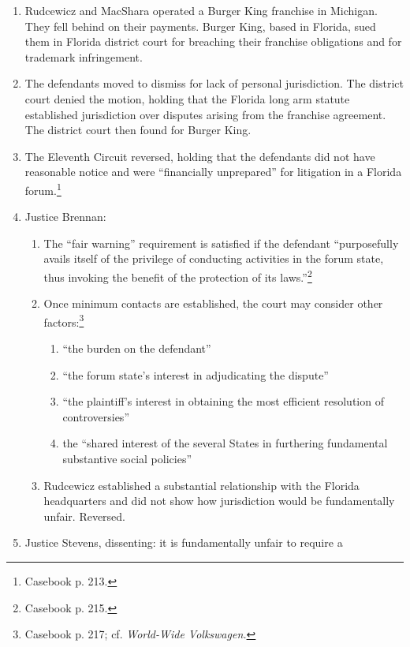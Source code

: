 \begin{enumerate}
    \item Rudcewicz and MacShara operated a Burger King franchise in Michigan. 
    They fell behind on their payments. Burger King, based in Florida, 
    sued them in Florida district court for breaching their franchise 
    obligations and for trademark infringement.
    \item The defendants moved to dismiss for lack of personal jurisdiction. 
    The district court denied the motion, holding that the Florida long arm statute 
    established jurisdiction over disputes arising from the franchise 
    agreement. The district court then found for Burger King.
    \item The Eleventh Circuit reversed, holding that the defendants did not 
    have reasonable notice and were ``financially unprepared'' for litigation 
    in a Florida forum.\footnote{Casebook p. 213.}
    \item Justice Brennan:
    \begin{enumerate}
        \item The ``fair warning'' requirement is satisfied if the defendant 
        ``purposefully avails itself of the privilege of conducting activities 
        in the forum state, thus invoking the benefit of the protection of its 
        laws.''\footnote{Casebook p. 215.}
        \item Once minimum contacts are established, the court may consider 
        other factors:\footnote{Casebook p. 217; cf. \emph{World-Wide 
        Volkswagen.}}
        \begin{enumerate}
            \item ``the burden on the defendant''
            \item ``the forum state's interest in adjudicating the dispute''
            \item ``the plaintiff's interest in obtaining the most efficient 
            resolution of controversies''
            \item the ``shared interest of the several States in furthering 
            fundamental substantive social policies''
        \end{enumerate}
        \item Rudcewicz established a substantial relationship with the 
        Florida headquarters and did not show how jurisdiction would be 
        fundamentally unfair. Reversed.
    \end{enumerate}
    \item Justice Stevens, dissenting: it is fundamentally unfair to require a 

\end{enumerate}
